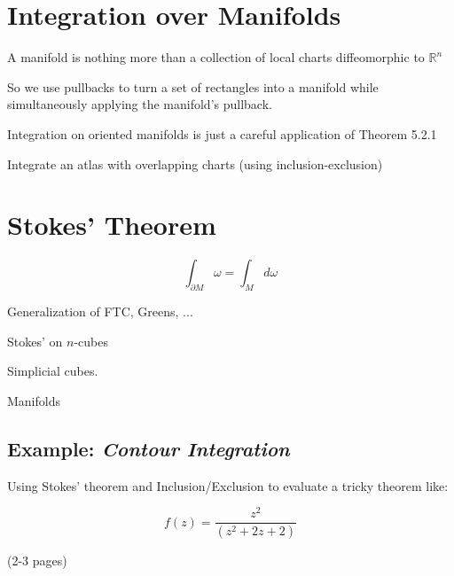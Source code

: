 %
%
\section{Integration over Manifolds}

A manifold is nothing more than a collection of local charts diffeomorphic to $\mathbb{R}^n$

So we use pullbacks to turn a set of rectangles into a manifold while simultaneously applying the manifold's pullback.

Integration on oriented manifolds is just a careful application of Theorem 5.2.1

\begin{example}
Integrate an atlas with overlapping charts (using inclusion-exclusion)
\end{example}




%
%
\section{Stokes' Theorem}

\begin{equation}
	\int_{\partial M} \omega = \int_M d\omega
\end{equation}

Generalization of FTC, Greens, ...


Stokes' on $n$-cubes

Simplicial cubes.

Manifolds

\subsection{Example: \emph{Contour Integration}}

Using Stokes' theorem and Inclusion/Exclusion to evaluate a tricky theorem like:

\begin{equation}
f(z) = \frac{z^2}{(z^2 + 2z + 2)}
\end{equation}


 (2-3 pages)

\newpage
